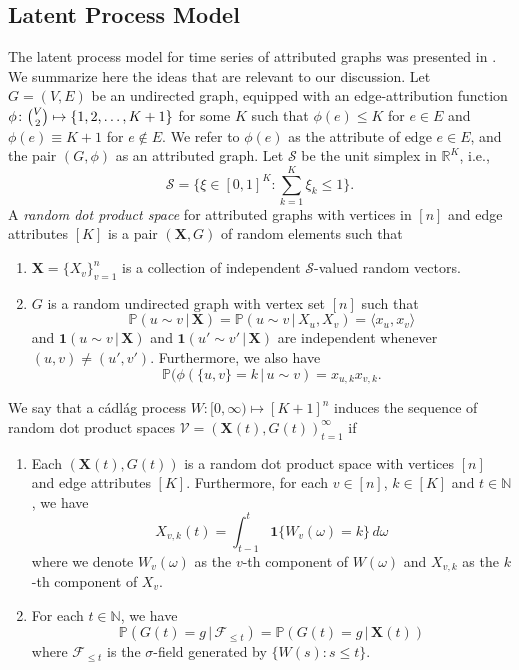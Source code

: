 \documentclass[10pt,journal,compsoc]{IEEEtran}
\theoremstyle{definition}
\begin{document}
\subsection{Latent Process Model}
The latent process model for time series of attributed graphs was
presented in \cite{lee11}. We summarize here the ideas that are
relevant to our discussion.  Let $G = (V,E)$ be an undirected graph,
equipped with an edge-attribution function $\phi \colon \tbinom{V}{2}
\mapsto \{1,2,\dots, K+1\}$ for some $K$ such that $\phi(e) \leq K$
for $e \in E$ and $\phi(e) \equiv K+1$ for $e \not \in E$. We refer to
$\phi(e)$ as the attribute of edge $e \in E$, and the pair $(G,\phi)$
as an attributed graph. Let $\mathscr{S}$ be the unit simplex in
$\mathbb{R}^{K}$, i.e.,
\begin{equation}
  \mathscr{S} = \{ \xi \in [0,1]^{K}
  \colon \sum_{k = 1}^{K} \xi_k \leq 1 \}.
\end{equation}
A {\em random dot product space} for attributed graphs with vertices
in $[n]$ and edge attributes $[K]$ is a pair $(\mathbf{X},G)$ of
random elements such that
\begin{enumerate}
\item $\mathbf{X} = \{X_v\}_{v = 1}^{n}$ is a collection of
  independent $\mathscr{S}$-valued random vectors.
\item $G$ is a random undirected graph with vertex set $[n]$ such that
  \begin{equation}
    \label{eq:1}
    \mathbb{P}(u \sim v \,|\, \mathbf{X}) = \mathbb{P}(u \sim v \, |
    \, X_u,X_v) = \langle x_u, x_v \rangle
  \end{equation}
  and $\bm{1}(u \sim v \,|\, \mathbf{X})$ and $\bm{1}(u' \sim
  v' \,|\, \mathbf{X})$ are independent whenever $(u,v) \not =
  (u',v')$. Furthermore, we also have 
  \begin{equation*}
    \mathbb{P}(\phi(\{u,v\} = k \, | \, u \sim
    v) = x_{u,k} x_{v,k}. 
  \end{equation*}
\end{enumerate}
We say that a c\'{a}dl\'{a}g process $W \colon [0,\infty) \mapsto
[K+1]^{n}$ induces the sequence of random dot product spaces
$\mathscr{V} = (\mathbf{X}(t), G(t))_{t = 1}^{\infty}$ if
\begin{enumerate}
\item Each $(\mathbf{X}(t), G(t))$ is a random dot product space with
  vertices $[n]$ and edge attributes $[K]$. Furthermore, for each $v
  \in [n]$, $k \in [K]$ and $t \in \mathbb{N}$, we have
  \begin{equation}
    \label{eq:54}
  X_{v,k}(t)  = \int_{t - 1}^{t}{ \mathbf{1}\{W_v(\omega) = k\}\, d\omega}
  \end{equation}
  where we denote $W_{v}(\omega)$ as the $v$-th component of $W(\omega)$ and
  $X_{v,k}$ as the $k$-th component of $X_v$.  
\item  For each $t \in \mathbb{N}$, we have
  \begin{equation}
    \label{eq:2}
    \mathbb{P}(G(t) = g \,|\, \mathscr{F}_{\leq t}) = \mathbb{P}(G(t)
    = g \,|\, \mathbf{X}(t))
  \end{equation}
where $\mathscr{F}_{\leq t}$ is the $\sigma$-field generated by $\{W(s)
  \colon s \leq t\}$.
\end{enumerate}
\end{document}
